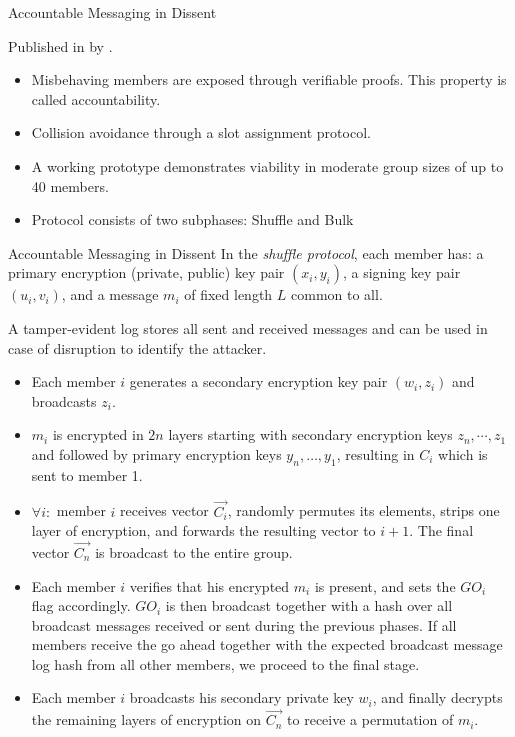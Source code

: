 \documentclass[]{beamer} %
\begin{document}
\begin{frame}{Accountable Messaging in Dissent}

Published in \citeyear{journals/corr/abs-1004-3057} by \citeauthor{journals/corr/abs-1004-3057}
\cite{journals/corr/abs-1004-3057}.

\begin{itemize}
\item Misbehaving members are exposed through verifiable proofs. This property is called
      accountability.
\item Collision avoidance through a slot assignment protocol.
\item A working prototype demonstrates viability in moderate group sizes of up to 40 members.
\item Protocol consists of two subphases: Shuffle and Bulk
\end{itemize}

\end{frame}

\begin{frame}[allowframebreaks]{Accountable Messaging in Dissent}
In the \emph{shuffle protocol}, each member has: a primary encryption
(private, public) key pair $(x_i, y_i)$, a signing key pair $(u_i, v_i)$, and a message $m_i$
of fixed length $L$ common to all.

A tamper-evident log stores all sent and received messages and can be used in
case of disruption to identify the attacker.

\begin{itemize}
\item Each member $i$ generates a secondary encryption key pair $(w_i, z_i)$ and broadcasts $z_i$.
\item $m_i$ is encrypted in $2n$ layers starting with secondary encryption keys $z_n, \cdots, z_1$
      and followed by primary encryption keys $y_n, \ldots, y_1$, resulting in $C_i$ which is sent
      to member 1.
\item $\forall i:$ member $i$ receives vector $\vec{C_i}$, randomly permutes its elements,
      strips one layer of encryption, and forwards the resulting vector to $i + 1$. The final
      vector $\vec{C_n}$ is broadcast to the entire group.
\item Each member $i$ verifies that
      his encrypted $m_i$ is present, and sets the $GO_i$ flag accordingly. $GO_i$ is then broadcast
      together with a hash over all broadcast messages received or sent during the previous phases.
      If all members receive the go ahead together with the expected broadcast message log hash
      from all other members, we proceed to the final stage.
\item Each member $i$ broadcasts his secondary private key $w_i$, and finally decrypts the remaining
      layers of encryption on $\vec{C_n}$ to receive a permutation of $m_i$.
\end{itemize}

\end{frame}
\end{document}
